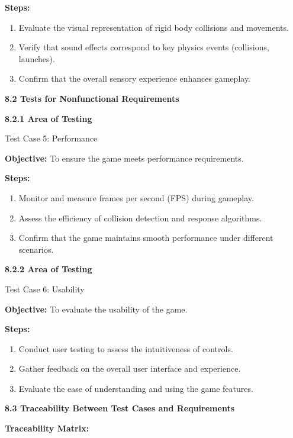 \documentclass[
]{article}
\begin{document}
\textbf{Steps:}

\begin{enumerate}
\def\labelenumi{\arabic{enumi}.}
\item
  Evaluate the visual representation of rigid body collisions and
  movements.
\item
  Verify that sound effects correspond to key physics events
  (collisions, launches).
\item
  Confirm that the overall sensory experience enhances gameplay.
\end{enumerate}

\protect\hypertarget{Am4}{}{}\textbf{8.2 Tests for Nonfunctional
Requirements}

\textbf{8.2.1 Area of Testing}

Test Case 5: Performance

\textbf{Objective:} To ensure the game meets performance requirements.

\textbf{Steps:}

\begin{enumerate}
\def\labelenumi{\arabic{enumi}.}
\item
  Monitor and measure frames per second (FPS) during gameplay.
\item
  Assess the efficiency of collision detection and response algorithms.
\item
  Confirm that the game maintains smooth performance under different
  scenarios.
\end{enumerate}

\textbf{8.2.2 Area of Testing}

Test Case 6: Usability

\textbf{Objective:} To evaluate the usability of the game.

\textbf{Steps:}

\begin{enumerate}
\def\labelenumi{\arabic{enumi}.}
\item
  Conduct user testing to assess the intuitiveness of controls.
\item
  Gather feedback on the overall user interface and experience.
\item
  Evaluate the ease of understanding and using the game features.
\end{enumerate}

\protect\hypertarget{Am7}{}{}\textbf{8.3 Traceability Between Test Cases
and Requirements}

\textbf{Traceability Matrix:}
\end{document}
